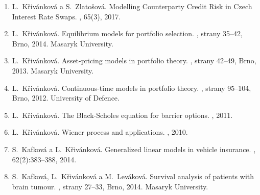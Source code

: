 \documentclass[a4paper,12pt]{report}
\theoremstyle{definition} \newtheorem{definice}[veta]{Definice}
\theoremstyle{remark}
\begin{document}
\begin{enumerate}
\renewcommand\labelenumi{\Roman{enumi}.}
\item
L.~Křivánková a S.~Zlatošová.
\newblock Modelling Counterparty Credit Risk in Czech Interest Rate Swaps.
, 65(3), 2017.

\item
L.~Křivánková.
\newblock Equilibrium models for portfolio selection.
, strany 35--42, Brno, 2014.
  Masaryk University.

\item
L.~Křivánková.
\newblock Asset-pricing models in portfolio theory.
, strany 42--49, Brno, 2013. Masaryk
  University.

\item
L.~Křivánková.
\newblock Continuous-time models in portfolio theory.
, strany 95--104, Brno, 2012. University of
  Defence.

\item
L.~Křivánková.
\newblock The Black-Scholes equation for barrier options.
, 2011.

\item
L.~Křivánková.
\newblock Wiener process and applications.
, 2010.

\item
S.~Kafková a L.~Křivánková.
\newblock Generalized linear models in vehicle insurance.
, 62(2):383--388, 2014.

\item
S.~Kafková, L.~Křivánková a M.~Leváková.
\newblock Survival analysis of patients with brain tumour.
, strany 27--33, Brno, 2014.
  Masaryk University.


\end{enumerate}
\end{document}
